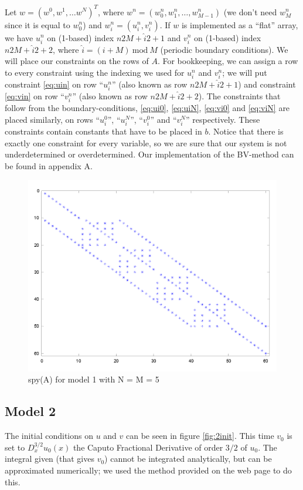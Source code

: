 \documentclass{article}
\renewcommand{\mod}{~\mathrm{mod}~}
\renewcommand{\(}{\left(}
\renewcommand{\)}{\right)}
\newcommand{\uin}{u_i^n}
\newcommand{\vin}{v_i^n}
\begin{document}
Let $w=(w^0, w^1, \dots w^N)^T$, where $w^n=(w_0^n,w_1^n,\dots,w_{M-1}^n)$ (we don't need $w_M^n$ since it is equal to $w_0^n$) and $w_i^n = (\uin,\vin)$. If $w$ is implemented as a ``flat'' array, we have $\uin$ on (1-based) index $n2M+\hat i 2+1$ and $\vin$ on (1-based) index $n2M+\hat i 2+2$, where $\hat i = (i+M)\mod M$ (periodic boundary conditions).%
We will place our constraints on the rows of $A$. For bookkeeping, we can assign a row to every constraint using the indexing we used for $\uin$ and $\vin$; we will put constraint \eqref{eq:uin} on row ``$\uin$'' (also known as row $n2M+\hat i 2+1$) and constraint \eqref{eq:vin} on row ``$\vin$'' (also known as row $n2M+\hat i 2+2$). The constraints that follow from the boundary-conditions, \eqref{eq:ui0}, \eqref{eq:uiN}, \eqref{eq:vi0} and \eqref{eq:viN} are placed similarly, on rows ``$u_i^0$'', ``$u_i^N$'', ``$v_i^0$'' and ``$v_i^N$'' respectively. These constraints contain constants that have to be placed in $b$. Notice that there is exactly one constraint for every variable, so we are sure that our system is not underdetermined or overdetermined. Our implementation of the BV-method can be found in appendix A.

\begin{figure}
\centering
\includegraphics[width=\textwidth]{spy.png}
\caption{spy(A) for model 1 with N = M = 5}
\label{fig:spy}
\end{figure}

\subsection*{Model 2}
The initial conditions on $u$ and $v$ can be seen in figure \ref{fig:2init}. This time $v_0$ is set to $D^{3/2}_xu_0(x)$ the Caputo Fractional Derivative of order $3/2$ of $u_0$. The integral given (that gives $v_0$) cannot be integrated analytically, but can be approximated numerically; we used the method provided on the web page to do this.
\end{document}
